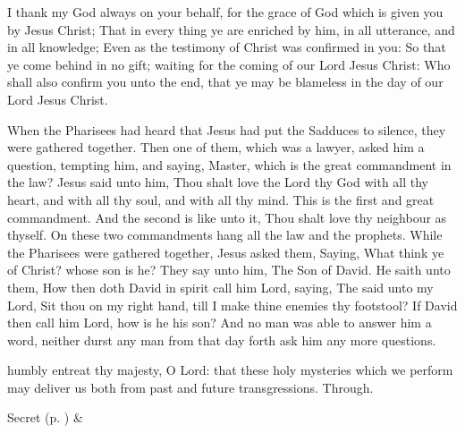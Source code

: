  I thank my God always on your behalf, for the grace of God which is given you by Jesus Christ; That in every thing ye are enriched by him, in all utterance, and in all knowledge; Even as the testimony of Christ was confirmed in you: So that ye come behind in no gift; waiting for the coming of our Lord Jesus Christ: Who shall also confirm you unto the end, that ye may be blameless in the day of our Lord Jesus Christ.


 When the Pharisees had heard that Jesus had put the Sadduces to silence, they were gathered together. Then one of them, which was a lawyer, asked him a question, tempting him, and saying, Master, which is the great commandment in the law? Jesus said unto him, Thou shalt love the Lord thy God with all thy heart, and with all thy soul, and with all thy mind. This is the first and great commandment. And the second is like unto it, Thou shalt love thy neighbour as thyself. On these two commandments hang all the law and the prophets. While the Pharisees were gathered together, Jesus asked them, Saying, What think ye of Christ? whose son is he? They say unto him, The Son of David. He saith unto them, How then doth David in spirit call him Lord, saying, The  said unto my Lord, Sit thou on my right hand, till I make thine enemies thy footstool? If David then call him Lord, how is he his son? And no man was able to answer him a word, neither durst any man from that day forth ask him any more questions.


\secret
{} humbly entreat thy majesty, O Lord: that these holy mysteries which we perform may deliver us both from past and future transgressions. Through.
\begin{rubric}
     Secret  (p. \pageref{SPSaints}) \&  
\end{rubric}

